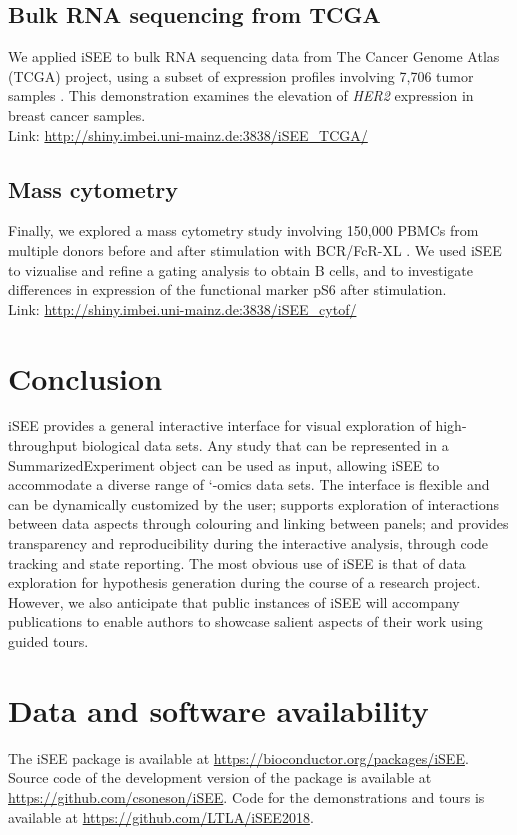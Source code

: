 \documentclass[10pt,a4paper,twocolumn]{article}
\begin{document}
\subsection*{Bulk RNA sequencing from TCGA}
We applied iSEE to bulk RNA sequencing data from The Cancer Genome Atlas (TCGA) project, using a subset of expression profiles involving 7,706 tumor samples \citep{piccolo2015TCGA}.
This demonstration examines the elevation of \textit{HER2} expression in breast cancer samples.\\

Link: \url{http://shiny.imbei.uni-mainz.de:3838/iSEE_TCGA/}

\subsection*{Mass cytometry}
Finally, we explored a mass cytometry study involving 150,000 PBMCs from multiple donors before and after stimulation with BCR/FcR-XL \citep{bodenmiller2012cytof}.
We used iSEE to vizualise and refine a gating analysis to obtain B cells, and to investigate differences in expression of the functional marker pS6 after stimulation.\\

Link: \url{http://shiny.imbei.uni-mainz.de:3838/iSEE_cytof/}

\section*{Conclusion}
iSEE provides a general interactive interface for visual exploration of high-throughput biological data sets.
Any study that can be represented in a SummarizedExperiment object can be used as input, allowing iSEE to accommodate a diverse range of `-omics data sets.
The interface is flexible and can be dynamically customized by the user; supports exploration of interactions between data aspects through colouring and linking between panels;
and provides transparency and reproducibility during the interactive analysis, through code tracking and state reporting. 
The most obvious use of iSEE is that of data exploration for hypothesis generation during the course of a research project.
However, we also anticipate that public instances of iSEE will accompany publications to enable authors to showcase salient aspects of their work using guided tours.

\section*{Data and software availability}
The iSEE package is available at \url{https://bioconductor.org/packages/iSEE}.
Source code of the development version of the package is available at \url{https://github.com/csoneson/iSEE}.
Code for the demonstrations and tours is available at \url{https://github.com/LTLA/iSEE2018}.
\end{document}
